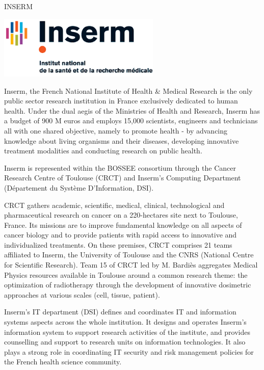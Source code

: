 \begin{sitedescription}{INSERM}

\begin{center}
\includegraphics[height=3cm]{Participants/Logos/Inserm.png}
\end{center}

Inserm, the French National Institute of Health \& Medical Research is the only
public sector research institution in France exclusively dedicated to human
health. Under the dual aegis of the Ministries of Health and Research, Inserm
has a budget of 900 M euros and employs 15,000 scientists, engineers and
technicians all with one shared objective, namely to promote health - by
advancing knowledge about living organisms and their diseases, developing
innovative treatment modalities and conducting research on public health.

Inserm is represented within the BOSSEE consortium through the Cancer Research
Centre of Toulouse (CRCT) and Inserm’s Computing Department (D\'epartement du
Système D’Information, DSI).

CRCT gathers academic, scientific, medical, clinical, technological and
pharmaceutical research on cancer on a 220-hectares site next to Toulouse,
France. Its missions are to improve fundamental knowledge on all aspects of
cancer biology and to provide patients with rapid access to innovative and
individualized treatments. On these premises, CRCT comprises 21 teams
affiliated to Inserm, the University of Toulouse and the CNRS (National Centre
for Scientific Research). Team 15 of CRCT led by M. Bardi\`es aggregates
Medical Physics resources available in Toulouse around a common research theme:
the optimization of radiotherapy through the development of innovative
dosimetric approaches at various scales (cell, tissue, patient).

Inserm's IT department (DSI) defines and coordinates IT and information systems
aspects across the whole institution. It designs and operates Inserm's
information system to support research activities of the institute, and
provides counselling and support to research units on information technologies.
It also plays a strong role in coordinating IT security and risk management
policies for the French health science community.


\end{sitedescription}
